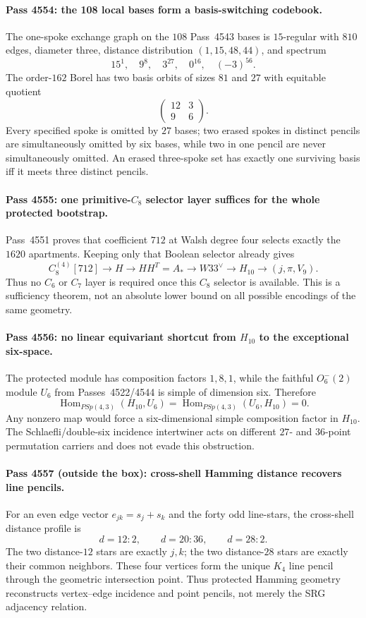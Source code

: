\paragraph{Pass 4554: the 108 local bases form a basis-switching codebook.}
The one-spoke exchange graph on the $108$ Pass~4543 bases is $15$-regular with
$810$ edges, diameter three, distance distribution $(1,15,48,44)$, and spectrum
\[
 15^1,\quad9^8,\quad3^{27},\quad0^{16},\quad(-3)^{56}.
\]
The order-$162$ Borel has two basis orbits of sizes $81$ and $27$ with equitable
quotient
\[
 \begin{pmatrix}12&3\\9&6\end{pmatrix}.
\]
Every specified spoke is omitted by $27$ bases; two erased spokes in distinct
pencils are simultaneously omitted by six bases, while two in one pencil are
never simultaneously omitted.  An erased three-spoke set has exactly one
surviving basis iff it meets three distinct pencils.

\paragraph{Pass 4555: one primitive-$C_8$ selector layer suffices for the whole protected bootstrap.}
Pass~4551 proves that coefficient $712$ at Walsh degree four selects exactly the
$1620$ apartments.  Keeping only that Boolean selector already gives
\[
 C_8^{(4)}[712]\to H\to HH^T=A_*\to W33^\vee\to H_{10}
 \to (j,\pi,V_9).
\]
Thus no $C_6$ or $C_7$ layer is required once this $C_8$ selector is available.
This is a sufficiency theorem, not an absolute lower bound on all possible
encodings of the same geometry.

\paragraph{Pass 4556: no linear equivariant shortcut from $H_{10}$ to the exceptional six-space.}
The protected module has composition factors $1,8,1$, while the faithful
$O^-_6(2)$ module $U_6$ from Passes~4522/4544 is simple of dimension six.
Therefore
\[
 \boxed{\operatorname{Hom}_{PSp(4,3)}(H_{10},U_6)=
        \operatorname{Hom}_{PSp(4,3)}(U_6,H_{10})=0.}
\]
Any nonzero map would force a six-dimensional simple composition factor in
$H_{10}$.  The Schlaefli/double-six incidence intertwiner acts on different
$27$- and $36$-point permutation carriers and does not evade this obstruction.

\paragraph{Pass 4557 (outside the box): cross-shell Hamming distance recovers line pencils.}
For an even edge vector $e_{jk}=s_j+s_k$ and the forty odd line-stars, the
cross-shell distance profile is
\[
 d=12:2,\qquad d=20:36,\qquad d=28:2.
\]
The two distance-$12$ stars are exactly $j,k$; the two distance-$28$ stars are
exactly their common neighbors.  These four vertices form the unique $K_4$
line pencil through the geometric intersection point.  Thus protected Hamming
geometry reconstructs vertex--edge incidence and point pencils, not merely the
SRG adjacency relation.

